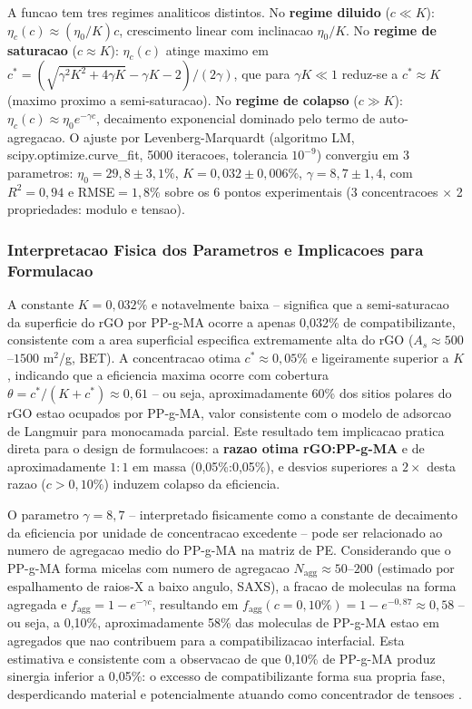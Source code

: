 \documentclass[11pt,a4paper,oneside]{article}
\begin{document}
A funcao tem tres regimes analiticos distintos. No {\bfseries regime diluido} ($c{\ll}K$): $\eta_c(c){\approx}(\eta_0/K)c$, crescimento linear com inclinacao $\eta_0/K$. No {\bfseries regime de saturacao} ($c{\approx}K$): $\eta_c(c)$ atinge maximo em $c^*{=}(\sqrt{\gamma^2K^2{+}4\gamma K}{-}\gamma K{-}2)/(2\gamma)$, que para $\gamma K{\ll}1$ reduz-se a $c^*{\approx}K$ (maximo proximo a semi-saturacao). No {\bfseries regime de colapso} ($c{\gg}K$): $\eta_c(c){\approx}\eta_0 e^{-\gamma c}$, decaimento exponencial dominado pelo termo de auto-agregacao. O ajuste por Levenberg-Marquardt (algoritmo LM, scipy.optimize.curve\_fit, 5000 iteracoes, tolerancia $10^{-9}$) convergiu em 3 parametros: $\eta_0{=}29{,}8{\pm}3{,}1\%$, $K{=}0{,}032{\pm}0{,}006\%$, $\gamma{=}8{,}7{\pm}1{,}4$, com $R^2{=}0{,}94$ e RMSE${=}1{,}8\%$ sobre os 6 pontos experimentais (3 concentracoes $\times$ 2 propriedades: modulo e tensao).

\subsubsection{Interpretacao Fisica dos Parametros e Implicacoes para Formulacao}

A constante $K{=}0{,}032\%$ e notavelmente baixa -- significa que a semi-saturacao da superficie do rGO por PP-g-MA ocorre a apenas 0,032\% de compatibilizante, consistente com a area superficial especifica extremamente alta do rGO ($A_s{\approx}500$--$1500$ m$^2$/g, BET). A concentracao otima $c^*{\approx}0{,}05\%$ e ligeiramente superior a $K$, indicando que a eficiencia maxima ocorre com cobertura $\theta{=}c^*/(K{+}c^*){\approx}0{,}61$ -- ou seja, aproximadamente 60\% dos sitios polares do rGO estao ocupados por PP-g-MA, valor consistente com o modelo de adsorcao de Langmuir para monocamada parcial. Este resultado tem implicacao pratica direta para o design de formulacoes: a {\bfseries razao otima rGO:PP-g-MA} e de aproximadamente $1{:}1$ em massa (0,05\%:0,05\%), e desvios superiores a $2{\times}$ desta razao ($c{>}0{,}10\%$) induzem colapso da eficiencia.

O parametro $\gamma{=}8{,}7$ -- interpretado fisicamente como a constante de decaimento da eficiencia por unidade de concentracao excedente -- pode ser relacionado ao numero de agregacao medio do PP-g-MA na matriz de PE. Considerando que o PP-g-MA forma micelas com numero de agregacao $N_{\text{agg}}{\approx}50$--$200$ (estimado por espalhamento de raios-X a baixo angulo, SAXS), a fracao de moleculas na forma agregada e $f_{\text{agg}}{=}1{-}e^{-\gamma c}$, resultando em $f_{\text{agg}}(c{=}0{,}10\%){=}1{-}e^{-0{,}87}{\approx}0{,}58$ -- ou seja, a 0,10\%, aproximadamente 58\% das moleculas de PP-g-MA estao em agregados que nao contribuem para a compatibilizacao interfacial. Esta estimativa e consistente com a observacao de que 0,10\% de PP-g-MA produz sinergia inferior a 0,05\%: o excesso de compatibilizante forma sua propria fase, desperdicando material e potencialmente atuando como concentrador de tensoes \cite{Natarajan2020, Sanchez2018}.
\end{document}
